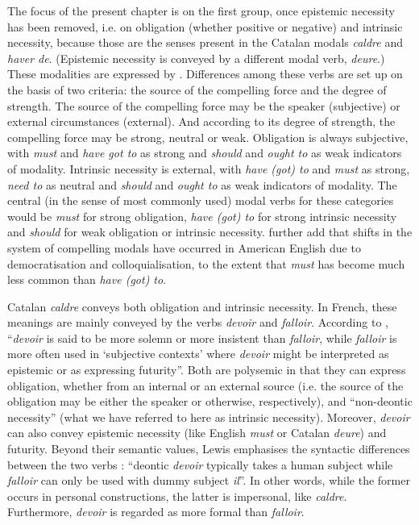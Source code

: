 \documentclass[output=paper,english,spanish,german,english]{langsci/langscibook}
\begin{document}
The focus of the present chapter is on the first group, once epistemic necessity has been removed, i.e. on obligation (whether positive or negative) and intrinsic necessity, because those are the senses present in the Catalan modals \textit{caldre} and \textit{haver de}. (Epistemic necessity is conveyed by a different modal verb, \textit{deure}.) These modalities are expressed by . Differences among these verbs are set up on the basis of two criteria: the source of the compelling force and the degree of strength. The source of the compelling force may be the speaker (subjective) or external circumstances (external). And according to its degree of strength, the compelling force may be strong, neutral or weak. Obligation is always subjective, with \textit{must} and \textit{have got to} as strong and \textit{should} and \textit{ought to} as weak indicators of modality. Intrinsic necessity is external, with \textit{have (got) to} and \textit{must} as strong, \textit{need to} as neutral and \textit{should} and \textit{ought to} as weak indicators of modality. The central (in the sense of most commonly used) modal verbs for these categories would be \textit{must} for strong obligation, \textit{have (got) to} for strong intrinsic necessity and \textit{should} for weak obligation or intrinsic necessity. \citet*[249]{raddir07} further add that shifts in the system of compelling modals have occurred in American English due to democratisation and colloquialisation, to the extent that \textit{must} has become much less common than \textit{have (got) to}.

Catalan \textit{caldre} conveys both obligation and intrinsic necessity. In French, these meanings are mainly conveyed by the verbs \textit{devoir} and \textit{falloir}. According to \citet[159]{lewis15}, \enquote{\textit{devoir} is said to be more solemn or more insistent than \textit{falloir}, while \textit{falloir} is more often used in \enquote{subjective contexts} where \textit{devoir }might be interpreted as epistemic or as expressing futurity}. Both are polysemic in that they can express obligation, whether from an internal or an external source (i.e. the source of the obligation may be either the speaker or otherwise, respectively), and \enquote{non-deontic necessity} (what we have referred to here as intrinsic necessity). Moreover, \textit{devoir} can also convey epistemic necessity (like English \textit{must} or Catalan \textit{deure}) and futurity. Beyond their semantic values, Lewis emphasises the syntactic differences between the two verbs \parencite*[158--159]{lewis15}: \enquote{deontic \textit{devoir} typically takes a human subject while \textit{falloir }can only be used with dummy subject \textit{il}}. In other words, while the former occurs in personal constructions, the latter is impersonal, like \textit{caldre}. Furthermore, \textit{devoir} is regarded as more formal than \textit{falloir}.
\end{document}

